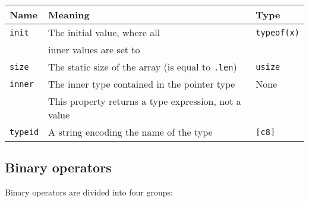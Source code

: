 \vspace{-20pt}%
\begin{center}\begin{adjustbox}{max width=\linewidth}
  \begin{tabular}{|l|ll|}
    \hline
    Name & Meaning & Type\\
    \hline
    \hline
    \texttt{init} & The initial value, where all & \texttt{typeof(x)} \\
    & inner values are set to  & \\
    \Xhline{0.001pt}
    \texttt{size} & The static size of the array (is equal to \texttt{.len}) & \texttt{usize} \\
    \Xhline{0.001pt}
    \texttt{inner} & The inner type contained in the pointer type & None\\
    & This property returns a type expression, not a value &\\
    \hline
    \texttt{typeid} & A string encoding the name of the type & \texttt{[c8]} \\
    \hline
  \end{tabular}
\end{adjustbox}\end{center}

\subsection {Binary operators}

Binary operators are divided into four groups:

